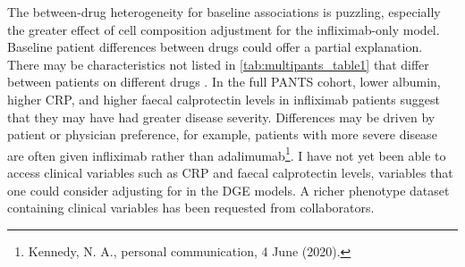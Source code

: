 The between-drug heterogeneity for baseline associations is puzzling, 
especially the greater effect of cell composition adjustment for the infliximab-only model. 
Baseline patient differences between drugs could offer a partial explanation.
There may be characteristics not listed in \cref{tab:multipants_table1} that differ between patients on different drugs \autocite{kennedy2019PredictorsAntiTNFTreatment}.
In the full \gls{PANTS} cohort, lower albumin, higher \gls{CRP}, and higher faecal calprotectin levels in infliximab patients suggest that they may have had greater disease severity.
Differences may be driven by patient or physician preference, for example, patients with more severe disease are often given infliximab rather than adalimumab\footnote{Kennedy, N. A., personal communication, 4 June (2020).}.
I have not yet been able to access clinical variables such as \gls{CRP} and faecal calprotectin levels, 
variables that one could consider adjusting for in the \gls{DGE} models.
A richer phenotype dataset containing clinical variables has been requested from collaborators.

